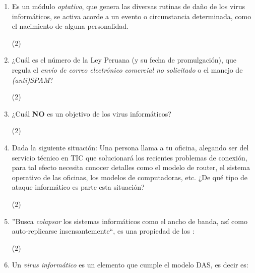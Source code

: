 \documentclass[10pt, a4paper]{article}
\begin{document}
\begin{enumerate}
\item{Es un módulo \emph{optativo}, que genera las diversas  rutinas de daño de los virus informáticos, se activa acorde a un evento o circunstancia determinada, como el nacimiento de alguna personalidad.
\begin{tasks}(2)
\end{tasks}
}
\item{¿Cuál es el número de la Ley Peruana (y su fecha de promulgación), que regula el \emph{envío de correo electrónico comercial no solicitado} o el manejo de \emph{(anti)SPAM}?
\begin{tasks}(2)
\end{tasks}
}
\item{¿Cuál \textbf{NO} es un objetivo de los virus informáticos?
\begin{tasks}(2)
\end{tasks}
}
\item{Dada la siguiente situación: Una persona llama a tu oficina, alegando ser del servicio técnico en TIC que solucionará los recientes problemas de conexión, para tal efecto necesita conocer detalles como el modelo de router, el sistema operativo de las oficinas, los modelos de computadoras, etc. ¿De qué tipo de ataque informático es parte esta situación?
\begin{tasks}(2)
\end{tasks}
}
\item{''Busca \emph{colapsar} los sistemas informáticos como el ancho de banda, así como auto-replicarse insensantemente``, es una propiedad de los :
\begin{tasks}(2)
\end{tasks}
}
\item{Un \emph{virus informático} es un elemento que cumple el modelo DAS, es decir es:
}
\end{enumerate}
\end{document}
